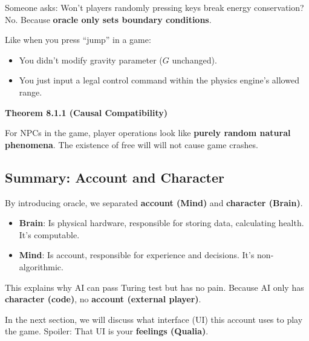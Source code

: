 Someone asks: Won't players randomly pressing keys break energy conservation?
No. Because \textbf{oracle only sets boundary conditions}.

Like when you press ``jump'' in a game:
\begin{itemize}
\item You didn't modify gravity parameter ($G$ unchanged).
\item You just input a legal control command within the physics engine's allowed range.
\end{itemize}

\textbf{Theorem 8.1.1 (Causal Compatibility)}

For NPCs in the game, player operations look like \textbf{purely random natural phenomena}.
The existence of free will will not cause game crashes.

\subsection{Summary: Account and Character}

By introducing oracle, we separated \textbf{account (Mind)} and \textbf{character (Brain)}.

\begin{itemize}
\item \textbf{Brain}: Is physical hardware, responsible for storing data, calculating health. It's computable.
\item \textbf{Mind}: Is account, responsible for experience and decisions. It's non-algorithmic.
\end{itemize}

This explains why AI can pass Turing test but has no pain. Because AI only has \textbf{character (code)}, no \textbf{account (external player)}.

In the next section, we will discuss what interface (UI) this account uses to play the game. Spoiler: That UI is your \textbf{feelings (Qualia)}.

